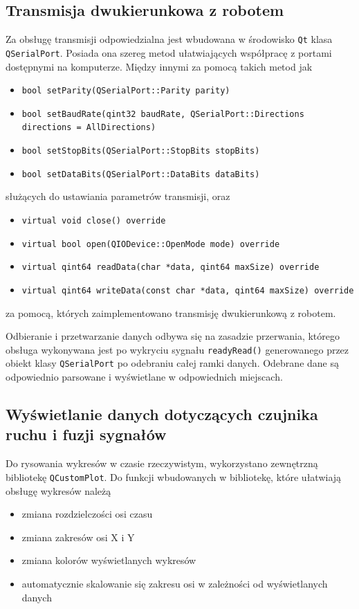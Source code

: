 \subsection{Transmisja dwukierunkowa z robotem}

Za obsługę transmisji odpowiedzialna jest wbudowana w środowisko \texttt{Qt} klasa \texttt{QSerialPort}. Posiada ona szereg metod ułatwiających współpracę z portami dostępnymi na komputerze. Między innymi za pomocą takich metod jak
\begin{itemize}
    \item \texttt{bool setParity(QSerialPort::Parity parity)}
    \item \texttt{bool setBaudRate(qint32 baudRate, QSerialPort::Directions directions = AllDirections)}
    \item \texttt{bool setStopBits(QSerialPort::StopBits stopBits)}
    \item \texttt{bool setDataBits(QSerialPort::DataBits dataBits)}
\end{itemize}
służących do ustawiania parametrów transmisji, oraz
\begin{itemize}
    \item \texttt{virtual void close() override}
    \item \texttt{virtual bool open(QIODevice::OpenMode mode) override}
    \item \texttt{virtual qint64 readData(char *data, qint64 maxSize) override}
    \item \texttt{virtual qint64 writeData(const char *data, qint64 maxSize) override}
\end{itemize}
za pomocą, których zaimplementowano transmisję dwukierunkową z robotem.

Odbieranie i przetwarzanie danych odbywa się na zasadzie przerwania, którego obsługa wykonywana jest po wykryciu sygnału \texttt{readyRead()} generowanego przez obiekt klasy \texttt{QSerialPort} po odebraniu całej ramki danych. Odebrane dane są odpowiednio parsowane i wyświetlane w odpowiednich miejscach.

\subsection{Wyświetlanie danych dotyczących czujnika ruchu i fuzji sygnałów}

Do rysowania wykresów w czasie rzeczywistym, wykorzystano zewnętrzną bibliotekę \texttt{QCustomPlot}. Do funkcji wbudowanych w bibliotekę, które ułatwiają obsługę wykresów należą
\begin{itemize}
    \item zmiana rozdzielczości osi czasu
    \item zmiana zakresów osi X i Y
    \item zmiana kolorów wyświetlanych wykresów
    \item automatycznie skalowanie się zakresu osi w zależności od wyświetlanych danych
\end{itemize}

